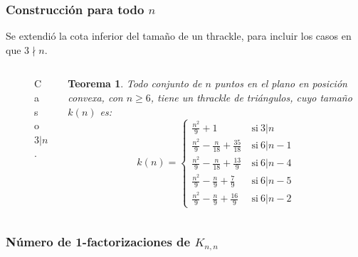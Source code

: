 \documentclass{beamer}
\newtheorem{teo}{Teorema}
\begin{document}
\begin{frame}[t]
  \frametitle{Construcción para todo $n$}
  Se extendió la cota inferior del tamaño de un thrackle, para incluir los
  casos en que $3\nmid n$.

  \begin{columns}
    \begin{column}{0.4\textwidth}
      \centering
      \begin{figure}
        \def\svgwidth{5cm}
        Caso $3|n$.
      \end{figure}
    \end{column}
    \begin{column}{0.5\textwidth}
      \begin{teo}
        Todo conjunto de $n$ puntos en el plano en posición convexa, con $n\ge6$,
        tiene un thrackle de triángulos, cuyo tamaño $k(n)$ es: 
        \[
          k(n) = 
          \begin{cases}
            \frac{n^2}{9}+1 &\ \text{si}\ 3|n \\
            \frac{n^2}{9}-\frac{n}{18}+\frac{35}{18} &\ \text{si}\ 6|n-1 \\
            \frac{n^2}{9}-\frac{n}{18}+\frac{13}{9}  &\ \text{si}\ 6|n-4 \\
            \frac{n^2}{9}-\frac{n}{9}+\frac{7}{9}   &\ \text{si}\ 6|n-5 \\
            \frac{n^2}{9}-\frac{n}{9}+\frac{16}{9}   &\ \text{si}\ 6|n-2
          \end{cases}
        \]
      \end{teo}
    \end{column}
  \end{columns}
\end{frame}

\begin{frame}
  \frametitle{Número de 1-factorizaciones de $K_{n,n}$}
  \centering
  \begin{figure}
    \def\svgwidth{10cm}
    
  \end{figure}
\end{frame}
\end{document}
